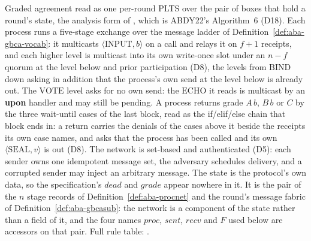 \begin{definition}
  \label{def:aba-gbca-impl}
  \leanok
  Graded agreement read as one per-round PLTS over the pair of boxes that hold a round's state, the analysis form of , which is ABDY22's Algorithm~6 (D18).
  Each process runs a five-stage exchange over the message ladder of Definition~\ref{def:aba-gbca-vocab}: it multicasts $\langle\mathrm{INPUT},b\rangle$ on a call and relays it on $f{+}1$ receipts, and each higher level is multicast into its own write-once slot under an $n{-}f$ quorum at the level below and prior participation (D8), the levels from $\mathrm{BIND}$ down asking in addition that the process's own send at the level below is already out.
  The $\mathrm{VOTE}$ level asks for no own send: the $\mathrm{ECHO}$ it reads is multicast by an \textbf{upon} handler and may still be pending.
  A process returns grade $A\,b$, $B\,b$ or $C$ by the three wait-until cases of the last block, read as the if/elif/else chain that block ends in: a return carries the denials of the cases above it beside the receipts its own case names, and asks that the process has been called and its own $\langle\mathrm{SEAL},v\rangle$ is out (D8).
  The network is set-based and authenticated (D5): each sender owns one idempotent message set, the adversary schedules delivery, and a corrupted sender may inject an arbitrary message.
  The state is the protocol's own data, so the specification's $dead$ and $grade$ appear nowhere in it.
  It is the pair of the $n$ stage records of Definition~\ref{def:aba-procnet} and the round's message fabric of Definition~\ref{def:aba-gbcasub}: the network is a component of the state rather than a field of it, and the four names $proc$, $sent$, $recv$ and $F$ used below are accessors on that pair.
  Full rule table: .
\end{definition}
